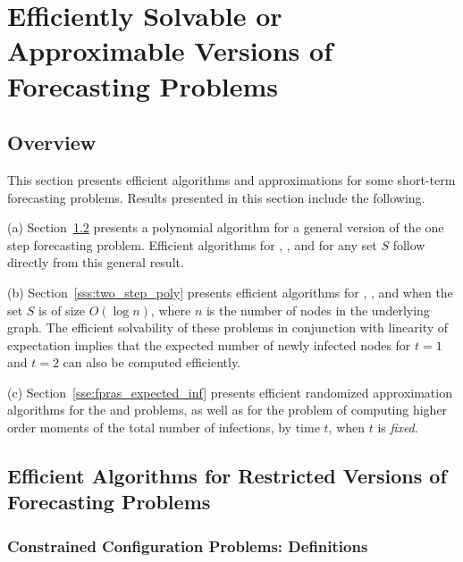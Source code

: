 \section{Efficiently Solvable or Approximable Versions of 
Forecasting Problems}
\label{sec:poly_versions}

\subsection{Overview}

This section presents efficient algorithms and approximations for some
short-term forecasting problems.
Results presented in this section include the following.

\begin{description}
\item{(a)}
Section~\ref{sse:poly} presents a polynomial
algorithm for a general version of the one step forecasting 
problem.
Efficient algorithms for \OneNewInfs, \OneTotInfs{}, \OneVuls{} and \OneTotVuls{}
for any set $S$ follow directly from this general result.
\item{(b)}
Section~\ref{sss:two_step_poly} presents efficient algorithms for 
\TwoNewInfs, \TwoTotInfs{}, \TwoVuls{} and \TwoTotVuls{} 
when the set $S$ is of size $O(\log{n})$, where
$n$ is the number of nodes in the underlying graph.
The efficient solvability of these problems in
conjunction with linearity of expectation \cite{MU-2005}
implies that the expected number
of newly infected nodes for 
$t = 1$ and $t = 2$ can also be computed efficiently.
\item{(c)}
Section~\ref{sse:fpras_expected_inf} presents efficient 
randomized approximation
algorithms for the \tTotVuls{} and \tTotInfs{} problems, 
as well as  for the problem of computing
higher order moments of the total number of infections, by
time $t$, when $t$ is \emph{fixed}.
\end{description}

\subsection{Efficient Algorithms for Restricted Versions of
Forecasting Problems}
\label{sse:poly}
 
\subsubsection{Constrained Configuration Problems: Definitions}
\label{sss:constrained_config}

